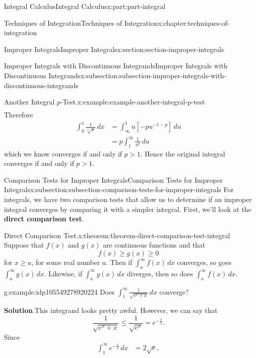 \documentclass[twoside,10pt,]{book}
\newcommand{\blocktitlefont}{\relax}
\newcommand{\terminology}[1]{\textbf{#1}}
\numberwithin{equation}{part}
\newcommand{\gt}{>}
\begin{document}
\begin{partptx}{Integral Calculus}{}{Integral Calculus}{}{}{x:part:part-integral}
\begin{chapterptx}{Techniques of Integration}{}{Techniques of Integration}{}{}{x:chapter:techniques-of-integration}
\begin{sectionptx}{Improper Integrals}{}{Improper Integrals}{}{}{x:section:section-improper-integrals}
\begin{subsectionptx}{Improper Integrals with Discontinuous Integrands}{}{Improper Integrals with Discontinuous Integrands}{}{}{x:subsection:subsection-improper-integrals-with-discontinuous-integrands}
\begin{example}{Another Integral \(p\)-Test.}{x:example:example-another-integral-p-test}
\begin{align*}
\end{align*}
Therefore%
\begin{align*}
\int_{0}^{1}\frac{1}{\sqrt[p]{x}}\,dx &= \int_{\infty}^{1}u\left[-pu^{-1 - p}\right]\,du\\
& = p\int_{1}^{\infty}\frac{1}{u^{p}}\,du
\end{align*}
which we know converges if and only if \(p \gt 1\). Hence the original integral converges if and only if \(p\gt1\).%
\end{example}
\end{subsectionptx}
%
%
\typeout{************************************************}
\typeout{************************************************}
%
\begin{subsectionptx}{Comparison Tests for Improper Integrals}{}{Comparison Tests for Improper Integrals}{}{}{x:subsection:subsection-comparison-tests-for-improper-integrals}
For integrals, we have two comparison tests that allow us to determine if an improper integral converges by comparing it with a simpler integral. First, we'll look at the \terminology{direct comparison test}.%
\begin{theorem}{Direct Comparison Test.}{}{x:theorem:theorem-direct-comparison-test-integral}%
%
Suppose that \(f(x)\) and \(g(x)\) are continuous functions and that%
\begin{equation*}
f(x) \geq g(x) \geq 0
\end{equation*}
for \(x\geq a\), for some real number \(a\). Then if \(\int_{a}^{\infty}f(x)\,dx\) converges, so goes \(\int_{a}^{\infty}g(x)\,dx\). Likewise, if \(\int_{a}^{\infty}g(x)\,dx\) diverges, then so does \(\int_{a}^{\infty}f(x)\,dx\).%
\end{theorem}
\begin{example}{}{g:example:idp105549278920224}%
Does \(\int_{1}^{\infty}\frac{1}{\sqrt{e^{x} + x}}\,dx\) converge?%
\par\smallskip%
\noindent\textbf{\blocktitlefont Solution}.\hypertarget{g:solution:idp105549278921120}{}\quad{}This integrand looks pretty awful. However, we can say that%
\begin{equation*}
\frac{1}{\sqrt{e^{x} + x}} \leq \frac{1}{\sqrt{e^{x}}} = e^{-\frac{x}{2}}.
\end{equation*}
Since%
\begin{align*}
\int_{1}^{\infty}e^{-\frac{x}{2}}\,dx & = 2\sqrt{e}, 
\end{align*}

\end{example}
\end{subsectionptx}
\end{sectionptx}
\end{chapterptx}
\end{partptx}
\end{document}
